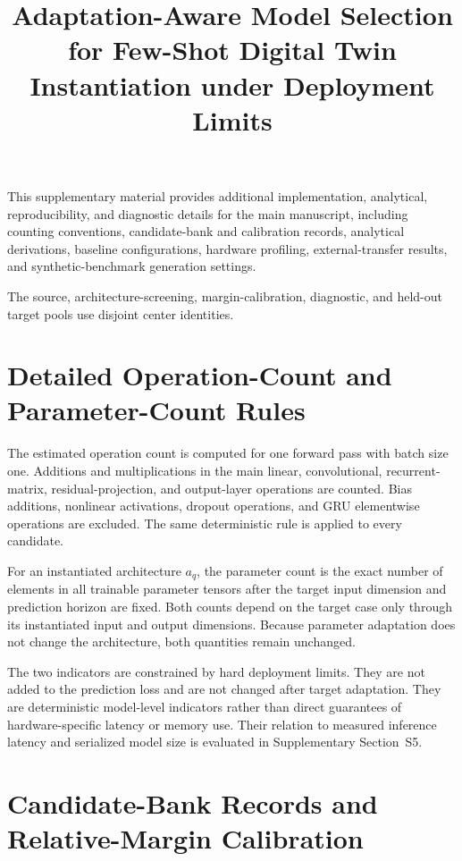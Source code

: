 \documentclass[11pt,a4paper]{article}
\title{Adaptation-Aware Model Selection for Few-Shot Digital Twin
Instantiation under Deployment Limits}
\author{}
\date{}
\begin{document}
\maketitle

This supplementary material provides additional implementation, analytical,
reproducibility, and diagnostic details for the main manuscript, including
counting conventions, candidate-bank and calibration records, analytical
derivations, baseline configurations, hardware profiling, external-transfer
results, and synthetic-benchmark generation settings.

The source, architecture-screening, margin-calibration, diagnostic, and
held-out target pools use disjoint center identities.

\section{Detailed Operation-Count and Parameter-Count Rules}
\label{supp:counting}

The estimated operation count is computed for one forward pass with batch
size one. Additions and multiplications in the main linear, convolutional,
recurrent-matrix, residual-projection, and output-layer operations are
counted. Bias additions, nonlinear activations, dropout operations, and GRU
elementwise operations are excluded. The same deterministic rule is applied
to every candidate.

For an instantiated architecture $a_q$, the parameter count is the exact
number of elements in all trainable parameter tensors after the target input
dimension and prediction horizon are fixed. Both counts depend on the target
case only through its instantiated input and output dimensions. Because
parameter adaptation does not change the architecture, both quantities remain
unchanged.

The two indicators are constrained by hard deployment limits. They are not
added to the prediction loss and are not changed after target adaptation.
They are deterministic model-level indicators rather than direct guarantees
of hardware-specific latency or memory use.
Their relation to measured inference latency and serialized model size is
evaluated in Supplementary Section~S5.

\section{Candidate-Bank Records and Relative-Margin Calibration}
\label{supp:bank-calibration}
\end{document}
